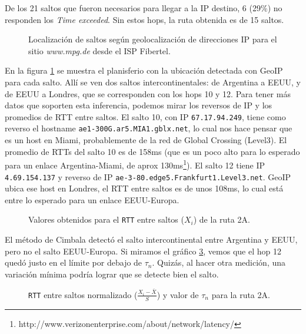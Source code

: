 De los 21 saltos que fueron necesarios para llegar a la IP destino, 6 (29\%) no responden los \emph{Time exceeded}. Sin estos hops, la ruta obtenida es de 15 saltos.

\begin{figure}[H]
    \caption{Localización de saltos según geolocalización de direcciones IP para
    el sitio \emph{www.mpg.de} desde el ISP Fibertel.}
    \label{res:esc2a:map}
\end{figure}

En la figura \ref{res:esc2a:map} se muestra el planisferio con la ubicación detectada con GeoIP para cada salto. Allí se ven dos saltos intercontinentales: de Argentina a EEUU, y de EEUU a Londres, que se corresponden con los hops 10 y 12. Para tener más datos que soporten esta inferencia, podemos mirar los reversos de IP y los promedios de RTT entre saltos. El salto 10, con IP \texttt{67.17.94.249}, tiene como reverso el hostname \texttt{ae1-300G.ar5.MIA1.gblx.net}, lo cual nos hace pensar que es un host en Miami, probablemente de la red de Global Crossing (Level3). El promedio de RTTs del salto 10 es de 158ms (que es un poco alto para lo esperado para un enlace Argentina-Miami, de aprox 130ms\footnote{http://www.verizonenterprise.com/about/network/latency/}). El salto 12 tiene IP \texttt{4.69.154.137} y reverso de IP \texttt{ae-3-80.edge5.Frankfurt1.Level3.net}. GeoIP ubica ese host en Londres, el RTT entre saltos es de unos 108ms, lo cual está entre lo esperado para un enlace EEUU-Europa.

\begin{figure}[H]
    \caption{Valores obtenidos para el \texttt{RTT} entre saltos ($X_i$) de la ruta 2A.}
    \label{res:esc2a:rtt}
\end{figure}

El método de Cimbala detectó el salto intercontinental entre Argentina y EEUU, pero no el salto EEUU-Europa. Si miramos el gráfico \ref{res:esc2a:rttnorm}, vemos que el hop 12 quedó justo en el límite por debajo de $\tau_n$. Quizás, al hacer otra medición, una variación mínima podría lograr que se detecte bien el salto.

\begin{figure}[H]
    \caption{\texttt{RTT} entre saltos normalizado ($\frac{X_i-\bar{X}}{S}$)
    y valor de $\tau_n$ para la ruta 2A.}
    \label{res:esc2a:rttnorm}
\end{figure}

